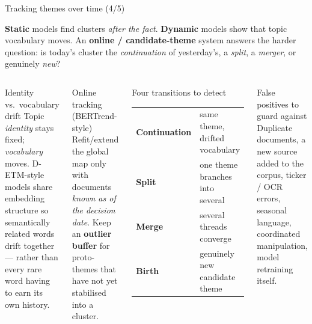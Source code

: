 \documentclass[10pt,aspectratio=169]{beamer}
\begin{document}
\begin{frame}[t]{Tracking themes over time (4/5)}
  \footnotesize

  \textbf{Static} models find clusters \emph{after the fact}.
  \textbf{Dynamic} models show that topic vocabulary moves.
  An \textbf{online / candidate-theme} system answers the harder question:
  is today's cluster the \emph{continuation} of yesterday's,
  a \emph{split}, a \emph{merger}, or genuinely \emph{new}?

  \vspace{0.20cm}
  \begin{columns}[T,onlytextwidth]
      \begin{block}{Identity vs.\ vocabulary drift}
        \footnotesize
        Topic \emph{identity} stays fixed; \emph{vocabulary} moves.
        D-ETM-style models share embedding structure so semantically
        related words drift together --- rather than every rare word
        having to earn its own history.
      \end{block}

      \begin{block}{Online tracking (BERTrend-style)}
        \footnotesize
        Refit/extend the global map only with documents
        \emph{known as of the decision date}.
        Keep an \textbf{outlier buffer} for proto-themes that have not
        yet stabilised into a cluster.
      \end{block}

      \begin{block}{Four transitions to detect}
        \footnotesize
        \begin{tabular}{@{}ll@{}}
          \textbf{Continuation} & same theme, drifted vocabulary \\
          \textbf{Split}        & one theme branches into several \\
          \textbf{Merge}        & several threads converge \\
          \textbf{Birth}        & genuinely new candidate theme \\
        \end{tabular}
      \end{block}

      \begin{block}{False positives to guard against}
        \footnotesize
        Duplicate documents, a new source added to the corpus,
        ticker / OCR errors, seasonal language,
        coordinated manipulation, model retraining itself.
      \end{block}
  \end{columns}

\end{frame}
\end{document}
